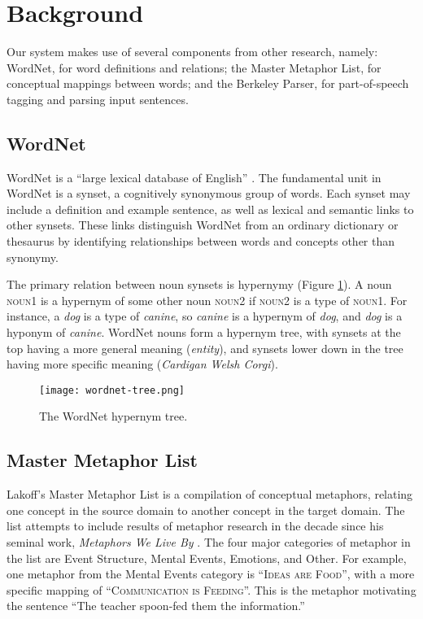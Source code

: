 \documentclass[12pt]{article}
\begin{document}
\section{Background}

Our system makes use of several components from other research, namely: WordNet, for word definitions and relations; the Master Metaphor List, for conceptual mappings between words; and the Berkeley Parser, for part-of-speech tagging and parsing input sentences.

\subsection{WordNet}

WordNet is a ``large lexical database of English'' \cite{wordnet}. The fundamental unit in WordNet is a synset, a cognitively synonymous group of words. Each synset may include a definition and example sentence, as well as lexical and semantic links to other synsets. These links distinguish WordNet from an ordinary dictionary or thesaurus by identifying relationships between words and concepts other than synonymy.

The primary relation between noun synsets is hypernymy (Figure \ref{fig:wordnettree}). A noun \textsc{noun1} is a hypernym of some other noun \textsc{noun2} if \textsc{noun2} is a type of \textsc{noun1}. For instance, a \emph{dog} is a type of \emph{canine}, so \emph{canine} is a hypernym of \emph{dog}, and \emph{dog} is a hyponym of \emph{canine}. WordNet nouns form a hypernym tree, with synsets at the top having a more general meaning (\emph{entity}), and synsets lower down in the tree having more specific meaning (\emph{Cardigan Welsh Corgi}).

\begin{figure}[h]
	\centering
	\texttt{[image: wordnet-tree.png]}
	\caption{The WordNet hypernym tree.}
	\label{fig:wordnettree}
\end{figure}

\subsection{Master Metaphor List}

Lakoff’s Master Metaphor List \cite{lakoff89} is a compilation of conceptual metaphors, relating one concept in the source domain to another concept in the target domain.  The list attempts to include results of metaphor research in the decade since his seminal work, \emph{Metaphors We Live By} \cite{lakoff80}.  The four major categories of metaphor in the list are Event Structure, Mental Events, Emotions, and Other.  For example, one metaphor from the Mental Events category is ``\textsc{Ideas are Food}'', with a more specific mapping of ``\textsc{Communication is Feeding}''.  This is the metaphor motivating the sentence ``The teacher spoon-fed them the information.''
\end{document}
